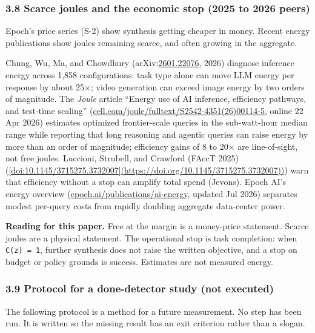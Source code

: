 \documentclass[
  10pt,
]{article}
\begin{document}
\subsubsection{3.8 Scarce joules and the economic stop (2025 to 2026
peers)}\label{scarce-joules-and-the-economic-stop-2025-to-2026-peers}

Epoch's price series (S-2) show synthesis getting cheaper in money.
Recent energy publications show joules remaining scarce, and often
growing in the aggregate.

Chung, Wu, Ma, and Chowdhury
(arXiv:\href{https://arxiv.org/abs/2601.22076}{2601.22076}, 2026)
diagnose inference energy across 1,858 configurations: task type alone
can move LLM energy per response by about 25×; video generation can
exceed image energy by two orders of magnitude. The \emph{Joule} article
``Energy use of AI inference, efficiency pathways, and test-time
scaling''
(\href{https://www.cell.com/joule/fulltext/S2542-4351(26)00114-5}{cell.com/joule/fulltext/S2542-4351(26)00114-5},
online 22 Apr 2026) estimates optimized frontier-scale queries in the
sub-watt-hour median range while reporting that long reasoning and
agentic queries can raise energy by more than an order of magnitude;
efficiency gains of 8 to 20× are line-of-sight, not free joules.
Luccioni, Strubell, and Crawford (FAccT 2025)
(\href{https://doi.org/10.1145/3715275.3732007\%5D(https://doi.org/10.1145/3715275.3732007)}{{[}doi:10.1145/3715275.3732007{]}(https://doi.org/10.1145/3715275.3732007))})
warn that efficiency without a stop can amplify total spend (Jevons).
Epoch AI's energy overview
(\href{https://epoch.ai/publications/ai-energy}{epoch.ai/publications/ai-energy},
updated Jul 2026) separates modest per-query costs from rapidly doubling
aggregate data-center power.

\textbf{Reading for this paper.} Free at the margin is a money-price
statement. Scarce joules are a physical statement. The operational stop
is task completion: when \texttt{C(z)\ =\ 1}, further synthesis does not
raise the written objective, and a stop on budget or policy grounds is
success. Estimates are not measured energy.

\subsubsection{3.9 Protocol for a done-detector study (not
executed)}\label{protocol-for-a-done-detector-study-not-executed}

The following protocol is a method for a future measurement. No step has
been run. It is written so the missing result has an exit criterion
rather than a slogan.
\end{document}
